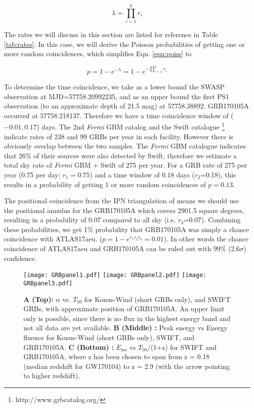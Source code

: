 \documentclass[twocolumn]{aastex61}
\begin{document}
\begin{equation}
\lambda = \prod_{i=1}^{k} r_i
\end{equation}

The rates we will discuss in this section are listed for reference in Table\,\ref{tab:rates}. 
In this case, we will derive the 
Poisson probabilities of getting one or more random coincidences, which simplifies Eqn. \ref{eqn:poiss} to 

\begin{equation}
p=1-e^{-\lambda} = 1 - e^{-\prod_{i=1}^{k} r_i}
\label{eqn:poiss0}
\end{equation}


To determine the time coincidence, we take as a lower bound the SWASP observation at MJD=57758.20992235,
\citep{GCN20434}
 and as an upper bound the first PS1 observation (to an approximate depth of 21.5 mag) at 57758.38892. GRB170105A occurred at 57758.218137.
Therefore we have a time coincidence window of ($-0.01,0.17$) days. 
The 2nd {\it Fermi} GBM catalog \citep{2014ApJS..211...13V}  and the Swift catalogue
\footnote{http://www.grbcatalog.org/}
\citep{2009MNRAS.397.1177E} indicate rates of 238 and 99 GRBs per year in each facility. However there is 
obviously overlap between the two samples.  The 
{\it Fermi} GBM catalogue indicates that 26\% of their sources were also detected by Swift, therefore we estimate 
a total sky rate of {\it Fermi} GBM + Swift of 275 per year. 
For a GRB rate of 
275 per year (0.75 per day; $r_1 = 0.75$) and a time window of 0.18 days ($r_2$=0.18), this results in a probability of getting 1 or more random coincidences of $p=0.13$. 

The positional coincidence from the IPN triangulation of 
\cite{GCN20406} means we should use the positional annulus for the GRB170105A 
which covers 2901.5 square degrees, resulting in a probability of 0.07 compared to all sky (i.e. $r_3$=0.07). 
Combining these probabilities, we get 1\% probability that GRB170105A was 
simply a chance coincidence
with ATLAS17aeu. 
($p=1 - e^{r_1 r_2 r_3}=0.01$). 
In other words the chance coincidence of ATLAS17aeu and GRB170105A can 
be ruled out with 99\% (2.6$\sigma$) confidence. 

\begin{figure}
\texttt{[image: GRBpanel1.pdf]}
\texttt{[image: GRBpanel2.pdf]}
\texttt{[image: GRBpanel3.pdf]}
\caption{
{\bf A (Top):} $\alpha$ vs. $T_{50}$ for Konus-Wind (short GRBs only), and SWIFT GRBs, with approximate position of GRB170105A.
An upper limit only is possible, since there is no flux in the 
highest energy band and not all data are yet available.  
{\bf B (Middle) :} Peak energy vs Energy fluence for Konus-Wind (short GRBs only), SWIFT, and GRB170105A. 
{\bf C (Bottom) :} $E_\mathrm{iso}$ vs $T_{50}$/(1+z)  for SWIFT and GRB170105A, where z has been chosen to span from z = 0.18 (median redshift for GW170104) to z = 2.9 (with the arrow pointing to higher redshift). 
}

\label{fig:grbs}
\end{figure}
\end{document}
